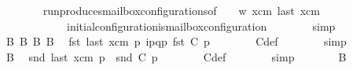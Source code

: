 \begin{isabellebody}
\ \ \ \ \ \ \isamarkupfalse%
\ run{\isacharunderscore}{\kern0pt}produces{\isacharunderscore}{\kern0pt}mailbox{\isacharunderscore}{\kern0pt}configurations{\isacharbrackleft}{\kern0pt}of\ {\isasymC}\isactrlsub {\isasymI}\isactrlsub {\isasymmm}\ {\isachardoublequoteopen}{\isasymB}\ {}{\isachardoublequoteclose}\ w\ xcm\ {\isachardoublequoteopen}last\ xcm{\isachardoublequoteclose}{\isacharbrackright}{\kern0pt}\isanewline
\ \ \ \ \ \ \ \ \ \ \ \ initial{\isacharunderscore}{\kern0pt}configuration{\isacharunderscore}{\kern0pt}is{\isacharunderscore}{\kern0pt}mailbox{\isacharunderscore}{\kern0pt}configuration\isanewline
\ \ \ \ \ \ \isamarkupfalse%
\ simp\isanewline
\ \ \ \ \isamarkupfalse%
\ \isamarkupfalse%
\ B{}\ B{}\ B{}\ B{}\ \isamarkupfalse%
\ {\isachardoublequoteopen}fst\ {\isacharparenleft}{\kern0pt}last\ {\isacharparenleft}{\kern0pt}{\isasymC}\isactrlsub {\isasymI}\isactrlsub {\isasymmm}{\isacharhash}{\kern0pt}xcm{\isacharparenright}{\kern0pt}\ p{\isacharparenright}{\kern0pt}\ {\isasymmidarrow}{\isacharparenleft}{\kern0pt}{\isacharbang}{\kern0pt}{\isasymlangle}{\isacharparenleft}{\kern0pt}i\isactrlbsup p{\isasymrightarrow}q\isactrlesup {\isacharparenright}{\kern0pt}{\isasymrangle}{\isacharparenright}{\kern0pt}{\isasymrightarrow}p\ {\isacharparenleft}{\kern0pt}fst\ {\isacharparenleft}{\kern0pt}C{}\ p{\isacharparenright}{\kern0pt}{\isacharparenright}{\kern0pt}{\isachardoublequoteclose}\isanewline
\ \ \ \ \ \ \isamarkupfalse%
\ C{}{\isacharunderscore}{\kern0pt}def\isanewline
\ \ \ \ \ \ \isamarkupfalse%
\ simp\isanewline
\ \ \ \ \isamarkupfalse%
\ \isamarkupfalse%
\ B{}\ \isamarkupfalse%
\ {\isachardoublequoteopen}snd\ {\isacharparenleft}{\kern0pt}last\ {\isacharparenleft}{\kern0pt}{\isasymC}\isactrlsub {\isasymI}\isactrlsub {\isasymmm}{\isacharhash}{\kern0pt}xcm{\isacharparenright}{\kern0pt}\ p{\isacharparenright}{\kern0pt}\ {\isacharequal}{\kern0pt}\ snd\ {\isacharparenleft}{\kern0pt}C{}\ p{\isacharparenright}{\kern0pt}{\isachardoublequoteclose}\isanewline
\ \ \ \ \ \ \isamarkupfalse%
\ C{}{\isacharunderscore}{\kern0pt}def\isanewline
\ \ \ \ \ \ \isamarkupfalse%
\ simp\isanewline
\ \ \ \ \isamarkupfalse%
\ \isamarkupfalse%
\ B{}\ \isamarkupfalse%

\end{isabellebody}
